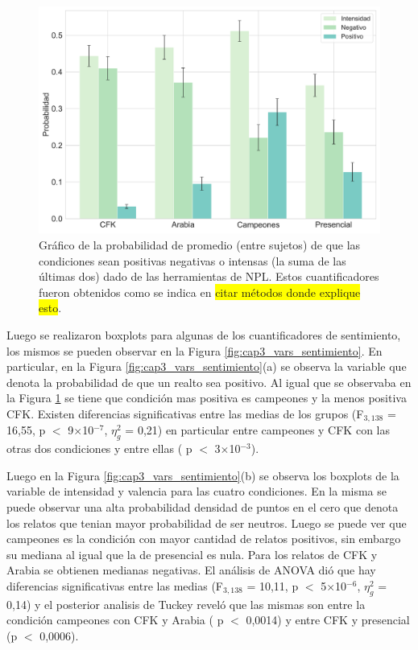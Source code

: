 \begin{figure}[H]
    \centering
    \includegraphics[width = 15cm]{figures/ch03/Herramientas NPL/Primer tiempo/Sin control/pysentimiento_tresbarras.pdf} 
    \caption{Gráfico de la probabilidad de promedio (entre sujetos) de que las condiciones sean positivas negativas o intensas (la suma de las últimas dos) dado de las herramientas de NPL. Estos cuantificadores fueron obtenidos como se indica en \colorbox{yellow}{citar métodos donde explique esto}.}
\label{fig:cap3_sent_barras}
\end{figure}

Luego se realizaron boxplots para algunas de los cuantificadores de sentimiento, los mismos se pueden observar en la Figura \ref{fig:cap3_vars_sentimiento}. En particular, en la Figura \ref{fig:cap3_vars_sentimiento}(a) se observa la variable que denota la probabilidad de que un realto sea positivo. Al igual que se observaba en la Figura \ref{fig:cap3_sent_barras} se tiene que condición mas positiva es campeones y la menos positiva CFK. Existen diferencias significativas entre las medias de los grupos (F$_{3, 138}$ = 16,55, p $<$ 9$\times$10$^{-7}$, $\eta_g^2$ = 0,21) en particular entre campeones y CFK con las otras dos condiciones y entre ellas ( p $<$ 3$\times$10$^{-3}$).

Luego en la Figura \ref{fig:cap3_vars_sentimiento}(b) se observa los boxplots de la variable de intensidad y valencia para las cuatro condiciones. En la misma se puede observar una alta probabilidad densidad de puntos en el cero que denota los relatos que tenian mayor probabilidad de ser neutros. Luego se puede ver que campeones es la condición con mayor cantidad de relatos positivos, sin embargo su mediana al igual que la de presencial es nula. Para los relatos de CFK y Arabia se obtienen medianas negativas. El análisis de ANOVA dió que hay diferencias significativas entre las medias (F$_{3, 138}$ = 10,11, p $<$ 5$\times$10$^{-6}$, $\eta_g^2$ = 0,14) y el posterior analisis de Tuckey reveló que las mismas son entre la condición campeones con CFK y Arabia ( p $<$ 0,0014) y entre CFK y presencial (p $<$ 0,0006).

